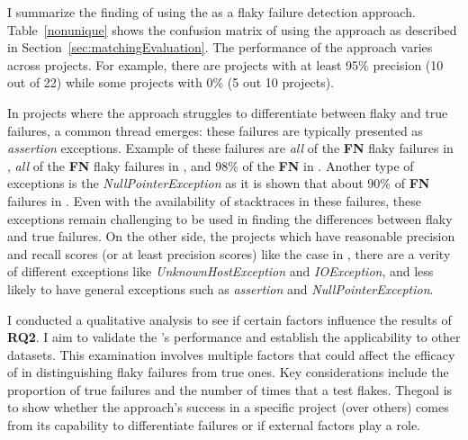 



I summarize the finding of using the \syntax as a flaky failure detection approach. 
Table~\ref{nonunique} shows the confusion matrix of using the approach as described in Section~\ref{sec:matchingEvaluation}.
The performance of the approach varies across projects. For example, there are projects with at least 95\% precision (10 out of 22) while some projects with 0\% (5 out 10 projects). 


In projects where the \syntax approach struggles to differentiate between flaky and true failures, a common thread emerges: these failures are typically presented as \emph{assertion} exceptions. 
Example of these failures are \emph{all} of the \textbf{FN} flaky failures in \websocket, \emph{all} of the \textbf{FN} flaky failures in \orbit, and 98\% of the \textbf{FN} in \http. Another type of exceptions is the \emph{NullPointerException} as it is shown that about 90\% of \textbf{FN} failures in \alluxio. Even with the availability of stacktraces in these failures, these exceptions remain challenging to be used in finding the differences between flaky and true failures. 
On the other side, the projects which have reasonable precision and recall scores (or at least precision scores) like the case in \hbase, there are a verity of different exceptions like \emph{UnknownHostException} and \emph{IOException}, and less likely to have general exceptions such as \emph{assertion} and \emph{NullPointerException}.

% 




I conducted a qualitative analysis to see if certain factors influence the results of \textbf{RQ2}. I aim to validate the \syntax's performance and establish the applicability to other datasets. This examination involves multiple factors that could affect the efficacy of \syntax in distinguishing flaky failures from true ones. Key considerations include the proportion of true failures and the number of times that a test flakes. Thegoal is to show whether the approach's success in a specific project (over others) comes from its capability to differentiate failures or if external factors play a role. 



